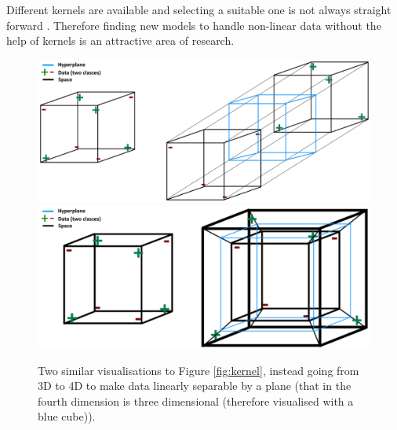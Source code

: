 \documentclass[a4paper,twoside]{bth}
\begin{document}
\par Different kernels are available and selecting a suitable one is not always straight forward \cite{multiconlitron}. Therefore finding new models to handle non-linear data without the help of kernels is an attractive area of research.

\begin{figure}
\centering
\includegraphics[scale=0.35]{images/dimred_images/kernel3d4dplane.png}
\includegraphics[scale=0.35]{images/dimred_images/kernel3d4dpottplane3.png}
   \caption{Two similar visualisations to Figure \ref{fig:kernel}, instead going from 3D to 4D to make data linearly separable by a plane (that in the fourth dimension is three dimensional (therefore visualised with a blue cube)). }
   \label{fig:kernel2}
\end{figure}
\end{document}
